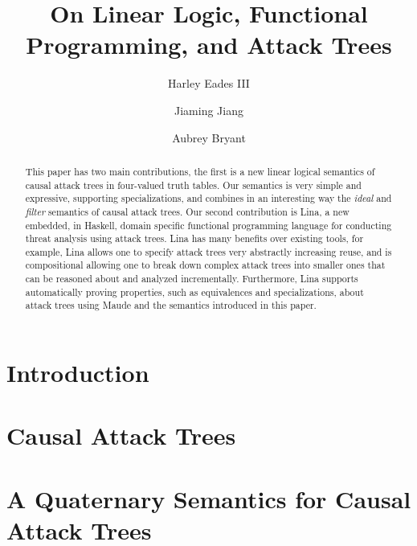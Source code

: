 \documentclass{llncs}
\date{}
\begin{document}
\title{On Linear Logic, Functional Programming, and Attack Trees}

\author{Harley Eades III \and Jiaming Jiang \and Aubrey Bryant}


\maketitle

\begin{abstract}
  This paper has two main contributions, the first is a new linear
  logical semantics of causal attack trees in four-valued truth
  tables.  Our semantics is very simple and expressive, supporting
  specializations, and combines in an interesting way the \emph{ideal}
  and \emph{filter} semantics of causal attack trees. Our second
  contribution is Lina, a new embedded, in Haskell, domain specific
  functional programming language for conducting threat analysis using
  attack trees.  Lina has many benefits over existing tools, for
  example, Lina allows one to specify attack trees very abstractly
  increasing reuse, and is compositional allowing one to break down
  complex attack trees into smaller ones that can be reasoned about
  and analyzed incrementally.  Furthermore, Lina supports
  automatically proving properties, such as equivalences and
  specializations, about attack trees using Maude and the semantics
  introduced in this paper.
\end{abstract}

\section{Introduction}
\label{sec:introduction}


\vspace{-7px}
\section{Causal Attack Trees}
\label{sec:causal_attack_trees}


\vspace{-7px}
\section{A Quaternary Semantics for Causal Attack Trees}
\label{sec:a_quaternary_semantics_for_causal_attack_trees}

\end{document}
